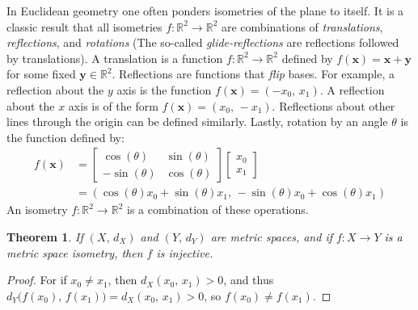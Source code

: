 \documentclass{article}
\theoremstyle{plain}
\newtheorem{theorem}{Theorem}[section]
\theoremstyle{normal}
\newenvironment{example}{%
    \pushQED{\qed}\renewcommand{\qedsymbol}{$\blacksquare$}\examplex%
}{%
    \popQED\endexamplex%
}
\begin{document}
        \begin{example}
            In Euclidean geometry one often ponders isometries of the plane
            to itself. It is a classic result that all isometries
            $f:\mathbb{R}^{2}\rightarrow\mathbb{R}^{2}$ are combinations
            of \textit{translations}, \textit{reflections}, and
            \textit{rotations} (The so-called \textit{glide-reflections}
            are reflections followed by translations). A translation
            is a function $f:\mathbb{R}^{2}\rightarrow\mathbb{R}^{2}$
            defined by $f(\mathbf{x})=\mathbf{x}+\mathbf{y}$ for some
            fixed $\mathbf{y}\in\mathbb{R}^{2}$. Reflections are functions that
            \textit{flip} bases. For example, a reflection about the $y$ axis
            is the function $f(\mathbf{x})=(-x_{0},\,x_{1})$. A reflection
            about the $x$ axis is of the form
            $f(\mathbf{x})=(x_{0},\,-x_{1})$. Reflections about other lines
            through the origin can be defined similarly. Lastly, rotation
            by an angle $\theta$ is the function defined by:
            \begin{align}
                f(\mathbf{x})&=
                \begin{bmatrix}
                    \cos(\theta)&\sin(\theta)\\
                    -\sin(\theta)&\cos(\theta)
                \end{bmatrix}
                \begin{bmatrix}
                    x_{0}\\
                    x_{1}
                \end{bmatrix}\\
                &=(\cos(\theta)x_{0}+\sin(\theta)x_{1},\,
                    -\sin(\theta)x_{0}+\cos(\theta)x_{1})
            \end{align}
            An isometry $f:\mathbb{R}^{2}\rightarrow\mathbb{R}^{2}$ is a
            combination of these operations.
        \end{example}
        \begin{theorem}
            If $(X,\,d_{X})$ and $(Y,\,d_{Y})$ are metric spaces, and if
            $f:X\rightarrow{Y}$ is a metric space isometry, then
            $f$ is injective.
        \end{theorem}
        \begin{proof}
            For if $x_{0}\ne{x}_{1}$, then $d_{X}(x_{0},\,x_{1})>0$, and thus
            $d_{Y}\big(f(x_{0}),\,f(x_{1})\big)=d_{X}(x_{0},\,x_{1})>0$,
            so $f(x_{0})\ne{f}(x_{1})$.
        \end{proof}
\end{document}
